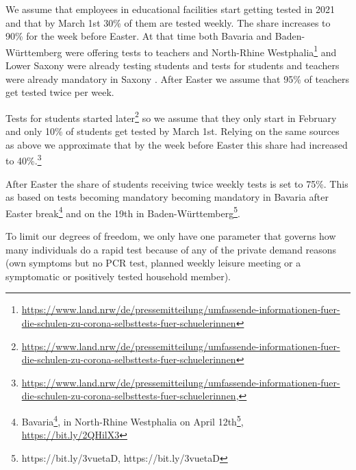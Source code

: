 
We assume that employees in educational facilities start getting tested in 2021 and that
by March 1st 30\% of them are tested weekly. The share increases to 90\% for the week
before Easter. At that time both Bavaria \citep{BayrischerRundfunk2021} and
Baden-Württemberg \citep{MinisteriumKultus2021} were offering tests to teachers and
North-Rhine
Westphalia\footnote{\url{https://www.land.nrw/de/pressemitteilung/umfassende-informationen-fuer-die-schulen-zu-corona-selbsttests-fuer-schuelerinnen}}
\cite{DPA2021} and Lower Saxony \citep{SueddeutscheZeitung2021} were already testing
students and tests for students and teachers were already mandatory in Saxony
\citep{SueddeutscheZeitung2021a}. After Easter we assume that 95\% of teachers get tested
twice per week.

Tests for students started
later\footnote{\url{https://www.land.nrw/de/pressemitteilung/umfassende-informationen-fuer-die-schulen-zu-corona-selbsttests-fuer-schuelerinnen}}
\citep{MinisteriumKultus2021} so we assume that they only start in February and only 10\%
of students get tested by March 1st. Relying on the same sources as above we approximate
that by the week before Easter this share had increased to
40\%.\footnote{\url{https://www.land.nrw/de/pressemitteilung/umfassende-informationen-fuer-die-schulen-zu-corona-selbsttests-fuer-schuelerinnen},
}

After Easter the share of students receiving twice weekly tests is set to 75\%. This as
based on tests becoming mandatory becoming mandatory in Bavaria after Easter
break\footnote{Bavaria\footnote{\url{https://bit.ly/3nz5fXS}}, in North-Rhine Westphalia
on April
12th\footnote{https://www.schulministerium.nrw/ministerium/schulverwaltung/schulmail-archiv/14042021-schulbetrieb-im-wechselunterricht-ab-montag},
\url{https://bit.ly/2QHilX3}} and on the 19th in
Baden-Württemberg\footnote{https://bit.ly/3vuetaD, https://bit.ly/3vuetaD}.


To limit our degrees of freedom, we only have one parameter that governs how many
individuals do a rapid test because of any of the private demand reasons (own symptoms
but no PCR test, planned weekly leisure meeting or a symptomatic or positively tested
household member).

